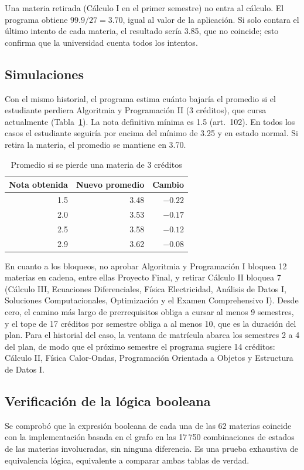 \documentclass[11pt,a4paper]{article}
\begin{document}
Una materia retirada (Cálculo I en el primer semestre) no entra al cálculo. El programa obtiene $99.9/27=3.70$, igual al valor de la aplicación. Si solo contara el último intento de cada materia, el resultado sería 3.85, que no coincide; esto confirma que la universidad cuenta todos los intentos.

\subsection{Simulaciones}
Con el mismo historial, el programa estima cuánto bajaría el promedio si el estudiante perdiera Algoritmia y Programación II (3 créditos), que cursa actualmente (Tabla~\ref{tab:simulacion}). La nota definitiva mínima es 1.5 (art.~102). En todos los casos el estudiante seguiría por encima del mínimo de 3.25 y en estado normal. Si retira la materia, el promedio se mantiene en 3.70.

\begin{table}[htbp]
\centering
\caption{Promedio si se pierde una materia de 3 créditos}
\label{tab:simulacion}
\begin{tabular}{rrr}
\toprule
Nota obtenida & Nuevo promedio & Cambio \\
\midrule
1.5 & 3.48 & $-0.22$ \\
2.0 & 3.53 & $-0.17$ \\
2.5 & 3.58 & $-0.12$ \\
2.9 & 3.62 & $-0.08$ \\
\bottomrule
\end{tabular}
\end{table}

En cuanto a los bloqueos, no aprobar Algoritmia y Programación I bloquea 12 materias en cadena, entre ellas Proyecto Final, y retirar Cálculo II bloquea 7 (Cálculo III, Ecuaciones Diferenciales, Física Electricidad, Análisis de Datos I, Soluciones Computacionales, Optimización y el Examen Comprehensivo I). Desde cero, el camino más largo de prerrequisitos obliga a cursar al menos 9 semestres, y el tope de 17 créditos por semestre obliga a al menos 10, que es la duración del plan. Para el historial del caso, la ventana de matrícula abarca los semestres 2 a 4 del plan, de modo que el próximo semestre el programa sugiere 14 créditos: Cálculo II, Física Calor-Ondas, Programación Orientada a Objetos y Estructura de Datos I.

\subsection{Verificación de la lógica booleana}
Se comprobó que la expresión booleana de cada una de las 62 materias coincide con la implementación basada en el grafo en las 17\,750 combinaciones de estados de las materias involucradas, sin ninguna diferencia. Es una prueba exhaustiva de equivalencia lógica, equivalente a comparar ambas tablas de verdad.
\end{document}
